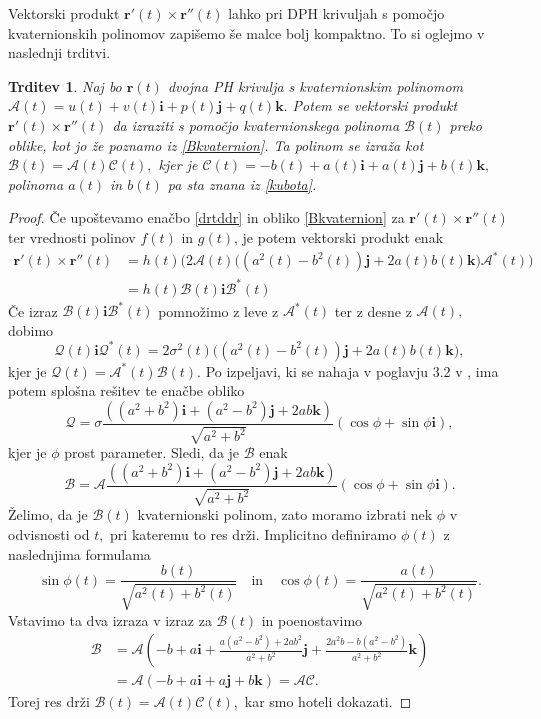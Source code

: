 \documentclass[12pt,a4paper,twoside]{article}
\theoremstyle{definition} %
\theoremstyle{plain} %
\newtheorem{trditev}[definicija]{Trditev}
\numberwithin{equation}{section}  %
\newcommand{\rV}{\mathbf{r}}
\newcommand{\iV}{\mathbf{i}}
\newcommand{\jV}{\mathbf{j}}
\newcommand{\kV}{\mathbf{k}}
\newcommand{\AQ}{\mathcal{A}}
\newcommand{\BQ}{\mathcal{B}}
\newcommand{\CQ}{\mathcal{C}}
\newcommand{\QQ}{\mathcal{Q}}
\begin{document}
Vektorski produkt $\rV'(t)\times\rV''(t)$ lahko pri DPH krivuljah s pomočjo kvaternionskih polinomov zapišemo še malce bolj kompaktno. To si oglejmo v naslednji trditvi.
\begin{trditev}
	\label{drtddr_za_DPH}
	Naj bo $\rV(t)$ dvojna PH krivulja s kvaternionskim polinomom $\AQ(t)=u(t)+v(t)\iV+p(t)\jV+q(t)\kV.$ Potem se vektorski produkt $\rV'(t)\times\rV''(t)$ da izraziti s pomočjo kvaternionskega polinoma $\BQ(t)$ preko oblike, kot jo že poznamo iz \eqref{Bkvaternion}. Ta polinom se izraža kot $\BQ(t)=\AQ(t)\CQ(t),$ kjer je $\CQ(t)=-b(t)+a(t)\iV+a(t)\jV+b(t)\kV,$ polinoma $a(t)$ in $b(t)$ pa sta znana iz \eqref{kubota}.
\end{trditev}
\begin{proof}
	Če upoštevamo enačbo \eqref{drtddr} in obliko \eqref{Bkvaternion} za $\rV'(t)\times\rV''(t)$ ter vrednosti polinov $f(t)$ in $g(t)$, je potem vektorski produkt enak
	\begin{align}
		\rV'(t)\times\rV''(t)&=h(t)\Big(2\AQ(t)\big((a^2(t)-b^2(t))\jV+2a(t)b(t)\kV\big)\AQ^*(t)\Big) \nonumber \\
		&=h(t)\BQ(t)\iV\BQ^*(t)
	\end{align}
	Če izraz $\BQ(t)\iV\BQ^*(t)$ pomnožimo z leve z $\AQ^*(t)$ ter z desne z $\AQ(t),$ dobimo
	\begin{equation*}
		\QQ(t)\iV\QQ^*(t)=2\sigma^2(t)\big((a^2(t)-b^2(t))\jV+2a(t)b(t)\kV\big),
	\end{equation*}
	kjer je $\QQ(t)=\AQ^*(t)\BQ(t).$ Po izpeljavi, ki se nahaja v poglavju 3.2 v \cite{farouki2002hermite}, ima potem splošna rešitev te enačbe obliko
	\begin{equation*}
		\QQ=\sigma\frac{((a^2+b^2)\iV+(a^2-b^2)\jV+2ab\kV)}{\sqrt{a^2+b^2}}(\cos\phi+\sin\phi\iV),
	\end{equation*}
	kjer je $\phi$ prost parameter. Sledi, da je $\BQ$ enak
	\begin{equation*}
		\BQ=\AQ\frac{((a^2+b^2)\iV+(a^2-b^2)\jV+2ab\kV)}{\sqrt{a^2+b^2}}(\cos\phi+\sin\phi\iV).
	\end{equation*}
	Želimo, da je $\BQ(t)$ kvaternionski polinom, zato moramo izbrati nek $\phi$ v odvisnosti od $t,$ pri kateremu to res drži. Implicitno definiramo $\phi(t)$ z naslednjima formulama
	\begin{equation*}
		\sin\phi(t)=\frac{b(t)}{\sqrt{a^2(t)+b^2(t)}}\quad\text{in}\quad\cos\phi(t)=\frac{a(t)}{\sqrt{a^2(t)+b^2(t)}}.
	\end{equation*}
	Vstavimo ta dva izraza v izraz za $\BQ(t)$ in poenostavimo
	\begin{align*}
		\BQ&=\AQ\left(-b+a\iV+\frac{a(a^2-b^2)+2ab^2}{a^2+b^2}\jV+\frac{2a^2b-b(a^2-b^2)}{a^2+b^2}\kV\right)\\
		&=\AQ(-b+a\iV+a\jV+b\kV)=\AQ\CQ.
	\end{align*}
	Torej res drži $\BQ(t)=\AQ(t)\CQ(t),$ kar smo hoteli dokazati.
\end{proof}
\end{document}
